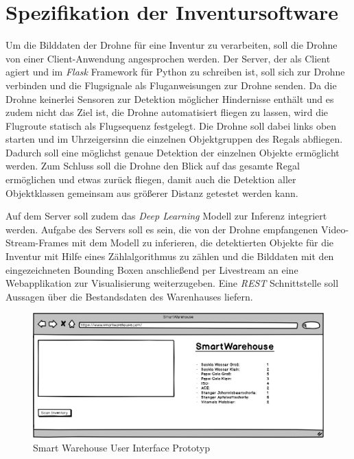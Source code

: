 \section{Spezifikation der Inventursoftware} \label{software}

Um die Bilddaten der Drohne für eine Inventur zu verarbeiten, soll die Drohne von einer Client-Anwendung angesprochen werden. Der Server, der als Client agiert und im \textit{Flask} Framework für Python zu schreiben ist, soll sich zur Drohne verbinden und die Flugsignale als Fluganweisungen zur Drohne senden. Da die Drohne keinerlei Sensoren zur Detektion möglicher Hindernisse enthält und es zudem nicht das Ziel ist, die Drohne automatisiert fliegen zu lassen, wird die Flugroute statisch als Flugsequenz festgelegt. Die Drohne soll dabei links oben starten und im Uhrzeigersinn die einzelnen Objektgruppen des Regals abfliegen. Dadurch soll eine möglichst genaue Detektion der einzelnen Objekte ermöglicht werden. Zum Schluss soll die Drohne den Blick auf das gesamte Regal ermöglichen und etwas zurück fliegen, damit auch die Detektion aller Objektklassen gemeinsam aus größerer Distanz getestet werden kann.

Auf dem Server soll zudem das \textit{Deep Learning} Modell zur Inferenz integriert werden. Aufgabe des Servers soll es sein, die von der Drohne empfangenen Video-Stream-Frames mit dem Modell zu inferieren, die detektierten Objekte für die Inventur mit Hilfe eines Zählalgorithmus zu zählen und die Bilddaten mit den eingezeichneten Bounding Boxen anschließend per Livestream an eine Webapplikation zur Visualisierung weiterzugeben. Eine \textit{REST} Schnittstelle soll Aussagen über die Bestandsdaten des Warenhauses liefern.

\begin{figure}[H]
	\begin{center}
		\includegraphics[width=15cm]{Bilder/UI.png} 
		\caption[Smart Warehouse User Interface Prototyp]{Smart Warehouse User Interface Prototyp}
		\label{ui}
	\end{center}
\end{figure}

